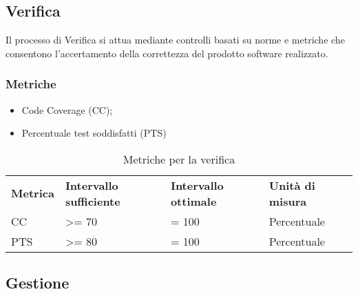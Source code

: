 \subsection{Verifica}
Il processo di Verifica si attua mediante controlli basati su norme e metriche che consentono l'accertamento della correttezza del prodotto software realizzato.
\subsubsection{Metriche}
\begin{itemize}
	\item Code Coverage (CC);
	\item Percentuale test soddisfatti (PTS)
\end{itemize}

\renewcommand{\arraystretch}{2.2}
\begin{longtable}{|C{2.5cm}|C{3.25cm}|C{3.25cm}|C{3cm}|}

	\caption{Metriche per la verifica}\\
	\hline

	\textbf{Metrica} & \textbf{Intervallo sufficiente}  & \textbf{Intervallo ottimale} & \textbf{Unità di misura}
	\tabularnewline
	\endfirsthead

	CC & >= 70  & = 100 & Percentuale \\
	PTS & >= 80 & = 100 & Percentuale \\

\end{longtable}


\subsection{Gestione}
